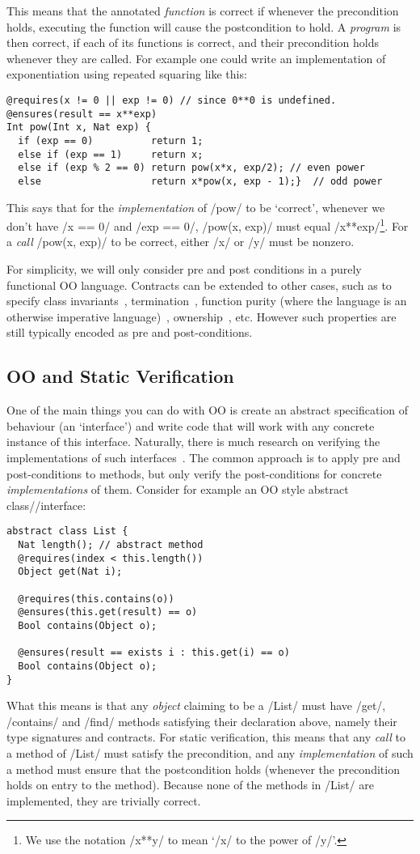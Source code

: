 This means that the annotated \emph{function} is correct if whenever the precondition holds, executing the function will cause the postcondition to hold. A \emph{program} is then correct, if each of its functions is correct, and their precondition holds whenever they are called. For example one could write an implementation of exponentiation using repeated squaring like this:
\begin{lstlisting}
@requires(x != 0 || exp != 0) // since 0**0 is undefined.
@ensures(result == x**exp)
Int pow(Int x, Nat exp) {
  if (exp == 0)          return 1;
  else if (exp == 1)     return x;
  else if (exp % 2 == 0) return pow(x*x, exp/2); // even power
  else                   return x*pow(x, exp - 1);}  // odd power
\end{lstlisting}
This says that for the \emph{implementation} of /pow/ to be `correct', whenever we don't have /x == 0/ and /exp == 0/, /pow(x, exp)/ must equal /x**exp/\footnote{We use the notation /x**y/ to mean `/x/ to the power of /y/'.}. For a \emph{call} /pow(x, exp)/ to be correct, either /x/ or /y/ must be nonzero.

For simplicity, we will only consider pre and post conditions in a purely functional OO language. Contracts can be extended to other cases, such as to specify class invariants~\cite{?}, termination~\cite{?}, function purity (where the language is an otherwise imperative language)~\cite{?}, ownership~\cite{?}, etc. However such properties are still typically encoded as pre and post-conditions.

\subsection{OO and Static Verification}
One of the main things you can do with OO is create an abstract specification of behaviour (an `interface') and write code that will work with any concrete instance of this interface. Naturally, there is much research on verifying the implementations of such interfaces~\cite{?}. The common approach is to apply pre and post-conditions to methods, but only verify the post-conditions for concrete \emph{implementations} of them. Consider for example an OO style abstract class//interface:
\begin{lstlisting}
abstract class List {
  Nat length(); // abstract method
  @requires(index < this.length())
  Object get(Nat i);
  
  @requires(this.contains(o))
  @ensures(this.get(result) == o)
  Bool contains(Object o);
  
  @ensures(result == exists i : this.get(i) == o)
  Bool contains(Object o);
}
\end{lstlisting}
What this means is that any \emph{object} claiming to be a /List/ must have /get/, /contains/ and /find/ methods satisfying their declaration above, namely their type signatures and contracts. For static verification, this means that any \emph{call} to a method of /List/ must satisfy the precondition, and any \emph{implementation} of such a method must ensure that the postcondition holds (whenever the precondition holds on entry to the method). Because none of the methods in /List/ are implemented, they are trivially correct. 

